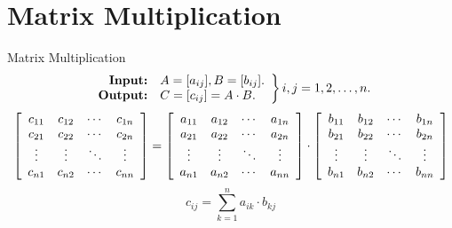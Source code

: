 \documentclass{beamer}
\begin{document}
\section{Matrix Multiplication}

\begin{frame}{Matrix Multiplication}
    $$
        \left.
            \begin{array}{r l}
                \text{\textbf{Input:}} & A=[a_{ij}], B=[b_{ij}] \text{.} \\
                \text{\textbf{Output:}} & C=[c_{ij}]=A \cdot B \text{.}
            \end{array}
        \right\} i, j = 1, 2, \ldots, n\text{.}
    $$
    \pause
    \centering
    \footnotesize
    \begin{equation*}
        \left[
            \begin{array}{c c c c}
                c_{11} & c_{12} & \cdots & c_{1n} \\
                c_{21} & c_{22} & \cdots & c_{2n} \\
                \vdots & \vdots & \ddots & \vdots \\
                c_{n1} & c_{n2} & \cdots & c_{nn} \\
            \end{array}
        \right]
        =
        \left[
            \begin{array}{c c c c}
                a_{11} & a_{12} & \cdots & a_{1n} \\
                a_{21} & a_{22} & \cdots & a_{2n} \\
                \vdots & \vdots & \ddots & \vdots \\
                a_{n1} & a_{n2} & \cdots & a_{nn} \\
            \end{array}
        \right]
        \cdot
        \left[
            \begin{array}{c c c c}
                b_{11} & b_{12} & \cdots & b_{1n} \\
                b_{21} & b_{22} & \cdots & b_{2n} \\
                \vdots & \vdots & \ddots & \vdots \\
                b_{n1} & b_{n2} & \cdots & b_{nn} \\
            \end{array}
        \right]
    \end{equation*}
    \pause
    \Large
    \begin{equation*}
        c_{ij} = \sum_{k=1}^{n} a_{ik} \cdot b_{kj}
    \end{equation*}
\end{frame}
\end{document}
